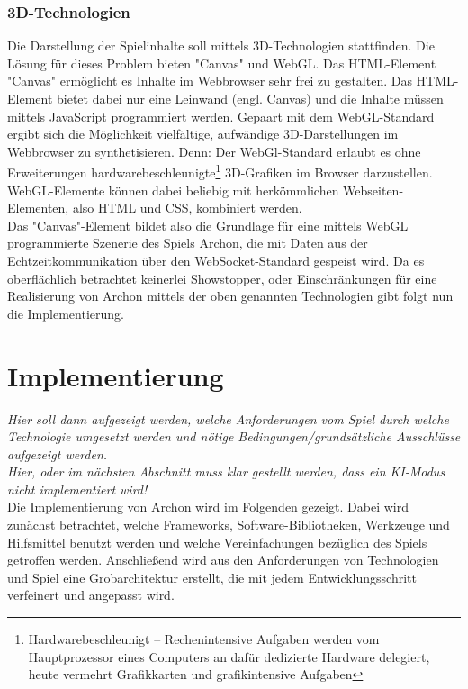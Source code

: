 \subsubsection{3D-Technologien}
Die Darstellung der Spielinhalte soll mittels 3D-Technologien stattfinden. Die Lösung für dieses Problem bieten "Canvas" und WebGL. Das HTML-Element "Canvas" ermöglicht es Inhalte im Webbrowser sehr frei zu gestalten. Das HTML-Element bietet dabei nur eine Leinwand (engl. Canvas) und die Inhalte müssen mittels JavaScript programmiert werden. Gepaart mit dem WebGL-Standard ergibt sich die Möglichkeit vielfältige, aufwändige 3D-Darstellungen im Webbrowser zu synthetisieren. Denn:  Der WebGl-Standard erlaubt es ohne Erweiterungen hardwarebeschleunigte\footnote{Hardwarebeschleunigt -- Rechenintensive Aufgaben werden vom Hauptprozessor eines Computers an dafür dedizierte Hardware delegiert, heute vermehrt Grafikkarten und grafikintensive Aufgaben} 3D-Grafiken im Browser darzustellen. WebGL-Elemente können dabei beliebig mit herkömmlichen Webseiten-Elementen, also HTML und CSS, kombiniert werden.\\

Das "Canvas"-Element bildet also die Grundlage für eine mittels WebGL programmierte Szenerie des Spiels Archon, die mit Daten aus der Echtzeitkommunikation über den WebSocket-Standard gespeist wird. Da es oberflächlich betrachtet keinerlei Showstopper, oder Einschränkungen für eine Realisierung von Archon mittels der oben genannten Technologien gibt folgt nun die Implementierung.
\section{Implementierung}
\label{sec:Umsetzung}

\emph{Hier soll dann aufgezeigt werden, welche Anforderungen vom Spiel durch welche Technologie umgesetzt werden und nötige Bedingungen/grundsätzliche Ausschlüsse aufgezeigt werden.\\Hier, oder im nächsten Abschnitt muss klar gestellt werden, dass ein KI-Modus nicht implementiert wird!}\\
Die Implementierung von Archon wird im Folgenden gezeigt. Dabei wird zunächst betrachtet, welche Frameworks, Software-Bibliotheken, Werkzeuge und Hilfsmittel benutzt werden und welche Vereinfachungen bezüglich des Spiels getroffen werden. Anschließend wird aus den Anforderungen von Technologien und Spiel eine Grobarchitektur erstellt, die mit jedem Entwicklungsschritt verfeinert und \ggf angepasst wird.

